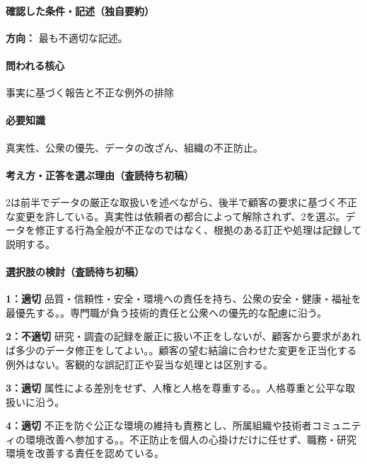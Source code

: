 \paragraph{確認した条件・記述（独自要約）}\mbox{}\par

\noindent\textbf{方向：} 最も不適切な記述。\par

\paragraph{問われる核心} 事実に基づく報告と不正な例外の排除

\paragraph{必要知識} 真実性、公衆の優先、データの改ざん、組織の不正防止。

\paragraph{考え方・正答を選ぶ理由（査読待ち初稿）} 2は前半でデータの厳正な取扱いを述べながら、後半で顧客の要求に基づく不正な変更を許している。真実性は依頼者の都合によって解除されず、2を選ぶ。データを修正する行為全般が不正なのではなく、根拠のある訂正や処理は記録して説明する。

\paragraph{選択肢の検討（査読待ち初稿）}\mbox{}\par

\noindent\textbf{1：適切} 品質・信頼性・安全・環境への責任を持ち、公衆の安全・健康・福祉を最優先する。。専門職が負う技術的責任と公衆への優先的な配慮に沿う。\par

\noindent\textbf{2：不適切} 研究・調査の記録を厳正に扱い不正をしないが、顧客から要求があれば多少のデータ修正をしてよい。。顧客の望む結論に合わせた変更を正当化する例外はない。客観的な誤記訂正や妥当な処理とは区別する。\par

\noindent\textbf{3：適切} 属性による差別をせず、人権と人格を尊重する。。人格尊重と公平な取扱いに沿う。\par

\noindent\textbf{4：適切} 不正を防ぐ公正な環境の維持も責務とし、所属組織や技術者コミュニティの環境改善へ参加する。。不正防止を個人の心掛けだけに任せず、職務・研究環境を改善する責任を認めている。\par

